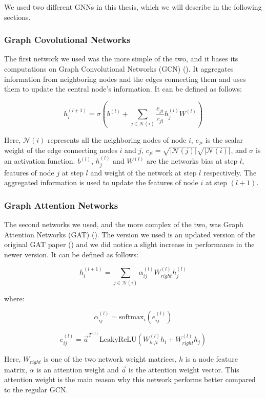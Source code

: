\documentclass[times, utf8, diplomski, english]{fer_eng}
\begin{document}
We used two different GNNs in this thesis, which we will describe in the following sections.

\subsubsection{Graph Covolutional Networks}

The first network we used was the more simple of the two, and it bases its computations on Graph Convolutional Networks (GCN) (\cite{GCN}). It aggregates information from neighboring nodes and the edges connecting them and uses them to update the central node's information. It can be defined as follows:

\[ h_i^{(l+1)} = \sigma (b^{(l)} + \sum_{j \in \mathcal{N}(i)} \frac{e_{ji}}{c_{ji}} h_j^{(l)} W^{(l)} ) \]

Here, $\mathcal{N}(i)$ represents all the neighboring nodes of node $i$, $e_{ji}$ is the scalar weight of the edge connecting nodes $i$ and $j$, $c_{ji} = \sqrt{|\mathcal{N}(j)|} \sqrt{|\mathcal{N}(i)|}$, and $\sigma$ is an activation function. $b^{(l)}$, $h_j^{(l)}$ and $W^{(l)}$ are the networks bias at step $l$, features of node $j$ at step $l$ and weight of the network at step $l$ respectively. The aggregated information is used to update the features of node $i$ at step $(l+1)$.

\subsubsection{Graph Attention Networks}

The second networks we used, and the more complex of the two, was Graph Attention Networks (GAT) (\cite{GATv2}). The version we used is an updated version of the original GAT paper (\cite{GAT}) and we did notice a slight increase in performance in the newer version. It can be defined as follows:

\[ h_i^{(l+1)} = \sum_{j \in \mathcal{N}(i)} \alpha_{ij}^{(l)} W_{right}^{(l)} h_j^{(l)} \]

where:

\[ \alpha_{ij}^{(l)} = \mathrm{softmax}_i (e_{ij}^{(l)}) \]

\[ e_{ij}^{(l)} = \vec{a}^{T^{(l)}} \mathrm{LeakyReLU} (W_{left}^{(l)} h_i + W_{right}^{(l)} h_j) \]

Here, $W_{right}$ is one of the two network weight matrices, $h$ is a node feature matrix, $\alpha$ is an attention weight and $\vec{a}$ is the attention weight vector. This attention weight is the main reason why this network performs better compared to the regular GCN.
\end{document}
